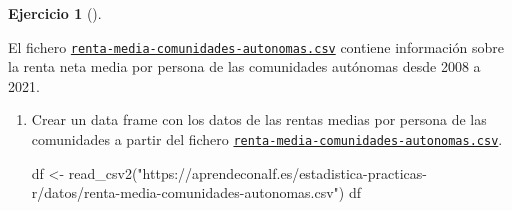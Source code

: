 \documentclass[
  a4paper,
]{scrreport}
\newenvironment{Shaded}{\begin{snugshade}}{\end{snugshade}}
\newcommand{\FunctionTok}[1]{\textcolor[rgb]{0.28,0.35,0.67}{#1}}
\newcommand{\NormalTok}[1]{\textcolor[rgb]{0.00,0.23,0.31}{#1}}
\newcommand{\OtherTok}[1]{\textcolor[rgb]{0.00,0.23,0.31}{#1}}
\newcommand{\StringTok}[1]{\textcolor[rgb]{0.13,0.47,0.30}{#1}}
\theoremstyle{definition}
\newtheorem{exercise}{Ejercicio}[chapter]
\theoremstyle{remark}
\begin{document}
\begin{exercise}[]\protect\hypertarget{exr-descriptiva-3}{}\label{exr-descriptiva-3}

El fichero
\href{datos/renta-media-comunidades-autonomas.csv}{\texttt{renta-media-comunidades-autonomas.csv}}
contiene información sobre la renta neta media por persona de las
comunidades autónomas desde 2008 a 2021.

\begin{enumerate}
\def\labelenumi{\alph{enumi}.}
\item
  Crear un data frame con los datos de las rentas medias por persona de
  las comunidades a partir del fichero
  \href{datos/renta-media-comunidades-autonomas.csv}{\texttt{renta-media-comunidades-autonomas.csv}}.

  \begin{tcolorbox}[enhanced jigsaw, toprule=.15mm, rightrule=.15mm, arc=.35mm, colback=white, colbacktitle=quarto-callout-tip-color!10!white, toptitle=1mm, left=2mm, colframe=quarto-callout-tip-color-frame, opacityback=0, breakable, opacitybacktitle=0.6, bottomtitle=1mm, titlerule=0mm, title=\textcolor{quarto-callout-tip-color}{\faLightbulb}\hspace{0.5em}{Solución}, bottomrule=.15mm, coltitle=black, leftrule=.75mm]

\begin{Shaded}
\begin{Highlighting}[]
\NormalTok{df }\OtherTok{\textless{}{-}} \FunctionTok{read\_csv2}\NormalTok{(}\StringTok{"https://aprendeconalf.es/estadistica{-}practicas{-}r/datos/renta{-}media{-}comunidades{-}autonomas.csv"}\NormalTok{)}
\NormalTok{df}
\end{Highlighting}
\end{Shaded}


\end{tcolorbox}
\end{enumerate}
\end{exercise}
\end{document}
